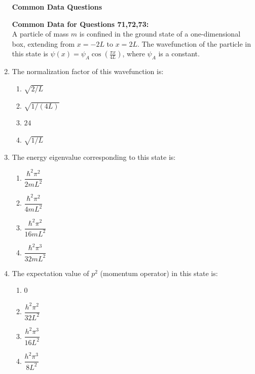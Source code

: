 \documentclass[journal,13pt,onecolumn]{IEEEtran}
\begin{document}
\begin{enumerate}[itemsep = 1em]
\newpage



\begin{center}
\textbf{Common Data Questions}     
\end{center}


\textbf{Common Data for Questions 71,72,73:} \\
A particle of mass $m$ is confined in the ground state of a one-dimensional box, extending from $x=-2L$ to $x=2L$. The wavefunction of the particle in this state is 
$\psi(x) = \psi_A \cos\left(\frac{\pi x}{4L}\right)$, where $\psi_A$ is a constant.


\item The normalization factor of this wavefunction is:

\hfill{}

\begin{multicols}{2}
\begin{enumerate}
    \item $\sqrt{2/L}$
    \item $\sqrt{1/(4L)}$
    \item $24$
    \item $\sqrt{1/L}$
\end{enumerate}
\end{multicols}

\item The energy eigenvalue corresponding to this state is:

\hfill{}

\begin{multicols}{2}
\begin{enumerate}
    \item $\dfrac{\hbar^2 \pi^2}{2 m L^2}$
    \item $\dfrac{\hbar^2 \pi^2}{4 m L^2}$
    \item $\dfrac{\hbar^2 \pi^2}{16 m L^2}$
    \item $\dfrac{\hbar^2 \pi^3}{32 m L^2}$
\end{enumerate}
\end{multicols}

\item The expectation value of $p^2$ (momentum operator) in this state is:

\hfill{}

\begin{multicols}{2}
\begin{enumerate}
    \item $0$
    \item $\dfrac{h^2 \pi^2}{32 L^2}$
    \item $\dfrac{h^2 \pi^3}{16 L^2}$
    \item $\dfrac{h^2 \pi^3}{8 L^2}$
\end{enumerate}
\end{multicols}




\end{enumerate}
\end{document}
